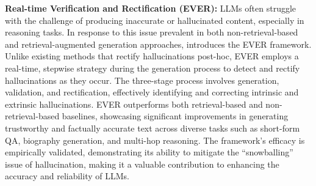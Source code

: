 \documentclass[11pt]{article}
\begin{document}
\textbf{Real-time Verification and Rectification (EVER):} LLMs often struggle with the challenge of producing inaccurate or hallucinated content, especially in reasoning tasks. In response to this issue prevalent in both non-retrieval-based and retrieval-augmented generation approaches, \cite{kang2023ever} introduces the EVER framework. Unlike existing methods that rectify hallucinations post-hoc, EVER employs a real-time, stepwise strategy during the generation process to detect and rectify hallucinations as they occur. The three-stage process involves generation, validation, and rectification, effectively identifying and correcting intrinsic and extrinsic hallucinations. EVER outperforms both retrieval-based and non-retrieval-based baselines, showcasing significant improvements in generating trustworthy and factually accurate text across diverse tasks such as short-form QA, biography generation, and multi-hop reasoning. The framework's efficacy is empirically validated, demonstrating its ability to mitigate the ``snowballing'' issue of hallucination, making it a valuable contribution to enhancing the accuracy and reliability of LLMs.
\end{document}
